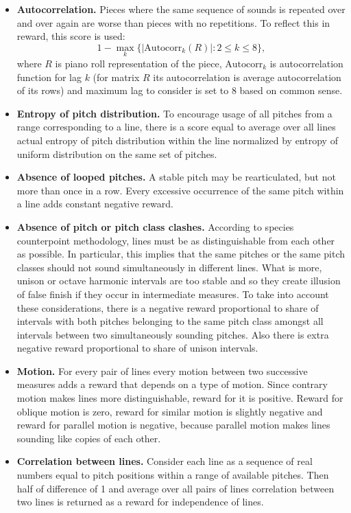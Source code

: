\documentclass{article}
\begin{document}
\begin{itemize}
	\item \textbf{Autocorrelation.} Pieces where the same sequence of sounds is repeated over and over again are worse than pieces with no repetitions. To reflect this in reward, this score is used:
	$$1 - \max_k \{|\mathrm{Autocorr}_k(R)| : 2 \le k \le 8\},$$
	where $R$ is piano roll representation of the piece, $\mathrm{Autocorr}_k$ is autocorrelation function for lag $k$ (for matrix $R$ its autocorrelation is average autocorrelation of its rows) and maximum lag to consider is set to 8 based on common sense.
	\item \textbf{Entropy of pitch distribution.} To encourage usage of all pitches from a range corresponding to a line, there is a score equal to average over all lines actual entropy of pitch distribution within the line normalized by entropy of uniform distribution on the same set of pitches.
	\item \textbf{Absence of looped pitches.} A stable pitch may be rearticulated, but not more than once in a row. Every excessive occurrence of the same pitch within a line adds constant negative reward.
	\item \textbf{Absence of pitch or pitch class clashes.} According to species counterpoint methodology, lines must be as distinguishable from each other as possible. In particular, this implies that the same pitches or the same pitch classes should not sound simultaneously in different lines. What is more, unison or octave harmonic intervals are too stable and so they create illusion of false finish if they occur in intermediate measures. To take into account these considerations, there is a negative reward proportional to share of intervals with both pitches belonging to the same pitch class amongst all intervals between two simultaneously sounding pitches. Also there is extra negative reward proportional to share of unison intervals.
	\item \textbf{Motion.} For every pair of lines every motion between two successive measures adds a reward that depends on a type of motion. Since contrary motion makes lines more distinguishable, reward for it is positive. Reward for oblique motion is zero, reward for similar motion is slightly negative and reward for parallel motion is negative, because parallel motion makes lines sounding like copies of each other.
	\item \textbf{Correlation between lines.} Consider each line as a sequence of real numbers equal to pitch positions within a range of available pitches. Then half of difference of 1 and average over all pairs of lines correlation between two lines is returned as a reward for independence of lines. 

\end{itemize}
\end{document}
